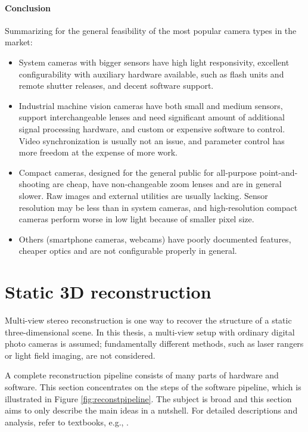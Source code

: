 
\paragraph{Conclusion}
Summarizing for the general feasibility of the most popular camera types in the market:

\begin{itemize}
	\item System cameras with bigger sensors have high light responsivity, excellent configurability with auxiliary hardware available, such as flash units and remote shutter releases, and decent software support.
	\item Industrial machine vision cameras have both small and medium sensors, support interchangeable lenses and need significant amount of additional signal processing hardware, and custom or expensive software to control.
		Video synchronization is usually not an issue, and parameter control has more freedom at the expense of more work.
	\item Compact cameras, designed for the general public for all-purpose point-and-shooting are cheap, have non-changeable zoom lenses and are in general slower.
		Raw images and external utilities are usually lacking.
		Sensor resolution may be less than in system cameras, and high-resolution compact cameras perform worse in low light because of smaller pixel size.
	\item Others (smartphone cameras, webcams) have poorly documented features, cheaper optics and are not configurable properly in general.
\end{itemize}


\clearpage
\section{Static 3D reconstruction} \label{sec:static3d} %

Multi-view stereo reconstruction is one way to recover the structure of a static three-dimensional scene.
In this thesis, a multi-view setup with ordinary digital photo cameras is assumed;
fundamentally different methods, such as laser rangers or light field imaging, are not considered.

A complete reconstruction pipeline consists of many parts of hardware and software.
This section concentrates on the steps of the software pipeline, which is illustrated in Figure \ref{fig:reconstpipeline}.
The subject is broad and this section aims to only describe the main ideas in a nutshell.
For detailed descriptions and analysis, refer to textbooks, e.g., \cite{hartley03multiview,heyden2005multiple,szeliski10vision}.


